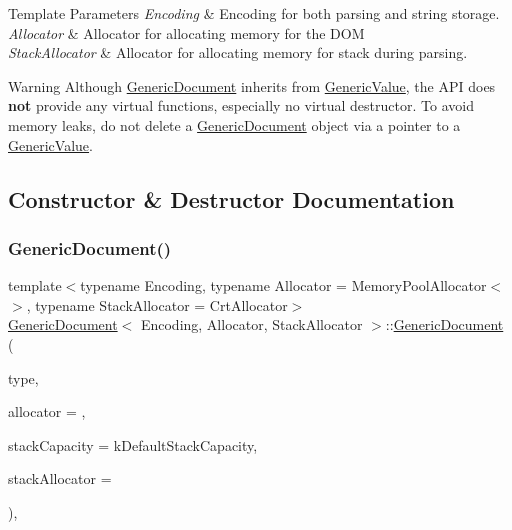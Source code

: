 \begin{DoxyTemplParams}{Template Parameters}
{\em Encoding} & Encoding for both parsing and string storage. \\
\hline
{\em Allocator} & Allocator for allocating memory for the D\+OM \\
\hline
{\em Stack\+Allocator} & Allocator for allocating memory for stack during parsing. \\
\hline
\end{DoxyTemplParams}
\begin{DoxyWarning}{Warning}
Although \hyperlink{class_generic_document}{Generic\+Document} inherits from \hyperlink{class_generic_value}{Generic\+Value}, the A\+PI does {\bfseries not} provide any virtual functions, especially no virtual destructor. To avoid memory leaks, do not {\ttfamily delete} a \hyperlink{class_generic_document}{Generic\+Document} object via a pointer to a \hyperlink{class_generic_value}{Generic\+Value}. 
\end{DoxyWarning}


\subsection{Constructor \& Destructor Documentation}
\mbox{\label{class_generic_document_a3da21e72ec8f26b9da77d86cc1d41cdd}} 
\subsubsection{\texorpdfstring{Generic\+Document()}{GenericDocument()}\hspace{0.1cm}{\footnotesize\ttfamily [1/2]}}
{\footnotesize\ttfamily template$<$typename Encoding, typename Allocator = Memory\+Pool\+Allocator$<$$>$, typename Stack\+Allocator = Crt\+Allocator$>$ \\
\hyperlink{class_generic_document}{Generic\+Document}$<$ Encoding, Allocator, Stack\+Allocator $>$\+::\hyperlink{class_generic_document}{Generic\+Document} (\begin{DoxyParamCaption}\item[{\hyperlink{rapidjson_8h_a1d1cfd8ffb84e947f82999c682b666a7}{Type}}]{type,  }\item[{Allocator $\ast$}]{allocator = {},  }\item[{size\+\_\+t}]{stack\+Capacity = {\ttfamily kDefaultStackCapacity},  }\item[{Stack\+Allocator $\ast$}]{stack\+Allocator = {} }\end{DoxyParamCaption})\hspace{0.3cm}{\ttfamily [inline]}, {\ttfamily [explicit]}}



